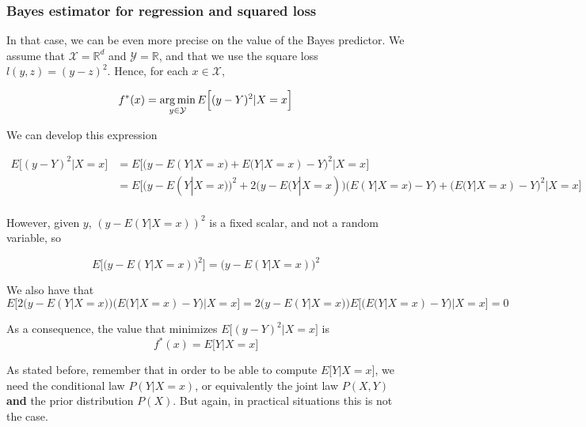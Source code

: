 \documentclass[
10pt, %
a4paper, %
oneside, %
headinclude,footinclude, %
BCOR5mm, %
]{scrartcl}
\begin{document}
    \subsubsection{\large\color{Periwinkle}Bayes estimator for regression and squared loss}

    In that case, we can be even more precise on the value of the Bayes predictor. We assume that $ \mathcal{X} = \mathbb{R}^d$ and $ \mathcal{Y}= \mathbb{R} $, and that we use the square loss $l(y,z)=(y-z)^2$. Hence, for each $x\in \mathcal{X} $,

\begin{equation*}
    f^*(x)= \operatorname*{arg\,min}_{y\in \mathcal{Y} }E\Big[(y-Y)^2 |X=x\Big]
\end{equation*}

We can develop this expression 

\begin{equation*}
    \begin{aligned}
	E\Big[(y-Y)^2 |X=x\Big]&= E\Big[\big(y-E(Y|X=x)+E(Y|X=x)-Y\big)^2 |X=x\Big]\\
	&=E\Big[\big(y-E(Y|X=x)\big)^2+2\big(y-E(Y|X=x)\big)\big(E(Y|X=x)-Y\big)+\big(E(Y|X=x)-Y\big)^2 |X=x\Big]\\
    \end{aligned}
\end{equation*}

However, given $y$, $(y-E(Y|X=x))^2$  is a fixed scalar, and not a random variable, so 

\begin{equation*}
    E\Big[\big(y-E(Y|X=x)\big)^2\Big]=\big(y-E(Y|X=x)\big)^2
\end{equation*}

We also have that
\begin{equation*}
    E\Big[2\big(y-E(Y|X=x)\big)\big(E(Y|X=x)-Y\big)|X=x\Big]=2\big(y-E(Y|X=x)\big)E\Big[\big(E(Y|X=x)-Y\big)|X=x\Big]=0
\end{equation*}

As a consequence, the value that minimizes $E\big[(y-Y)^2 |X=x\big]$ is
\begin{equation}
    f^*(x)=E\big[Y|X=x\big]
\end{equation}

\begin{remark}
    As stated before, remember that in order to be able to compute $E\big[Y|X=x\big]$, we need the conditional law
    $P(Y|X=x)$, or equivalently  the joint law $P(X,Y)$ \textbf{{and}} the prior
    distribution $P(X)$. But again, in practical situations this is not the
    case.
\end{remark}
\end{document}
